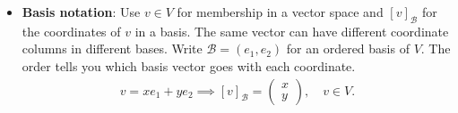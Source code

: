 \documentclass{report}
\begin{document}
\begin{itemize}
            \begin{enumerate}
                \item Start with the invariant vector:
                \begin{align*}
                    \sum _{i}v^{i}e_{i}=\sum _{j}\tilde{v}^{j}\tilde{e}_{j}
                .\end{align*}
                \item Substitute \(\tilde{e}_j = \sum_i A^i_j e_i\):
                    \begin{align*}
                        \sum _{i}v^{i}e_{i}=\sum _{j}\tilde{v}^{j}\left(\sum _{i}A_{j}^{i}e_{i}\right)=\sum _{i}\left(\sum _{j}A_{j}^{i}\tilde{v}^{j}\right)e_{i}
                    .\end{align*}
                \item Since the basis vectors \(e_{i}\) are linearly independent, the numbers multiplying each \(e_{i}\) on both sides must be equal:
                    \begin{align*}
                        v^{i}=\sum _{j}A_{j}^{i}\tilde{v}^{j}
                    .\end{align*}
                \item Solve for the new components \(\tilde{v}^{j}\):
                    In matrix-vector form, step 3 says \(v = A\tilde{v}\). To isolate \(\tilde{v}\), multiply both sides on the left by the inverse matrix \(A^{-1}\):
                    \begin{align*}
                        \tilde{v}=A^{-1}v\quad \iff \quad \tilde{v}^{j}=\sum _{i}(A^{-1})_{i}^{j}v^{i}
                    .\end{align*}
            \end{enumerate}
        \item \textbf{Basis notation}: Use \(v\in V\) for membership in a vector space and \([v]_{\mathcal B}\) for the coordinates of \(v\) in a basis. The same vector can have different coordinate columns in different bases.
            \bigbreak \noindent 
            Write \(\mathcal B=(e_1,e_2)\) for an ordered basis of \(V\). The order tells you which basis vector goes with each coordinate.
            \begin{align*}
                v = xe_{1} + ye_{2} \implies [v]_{\mathcal{B}} =\begin{pmatrix} x \\ y \end{pmatrix},\quad v \in V
            .\end{align*}

\end{itemize}
\end{document}
